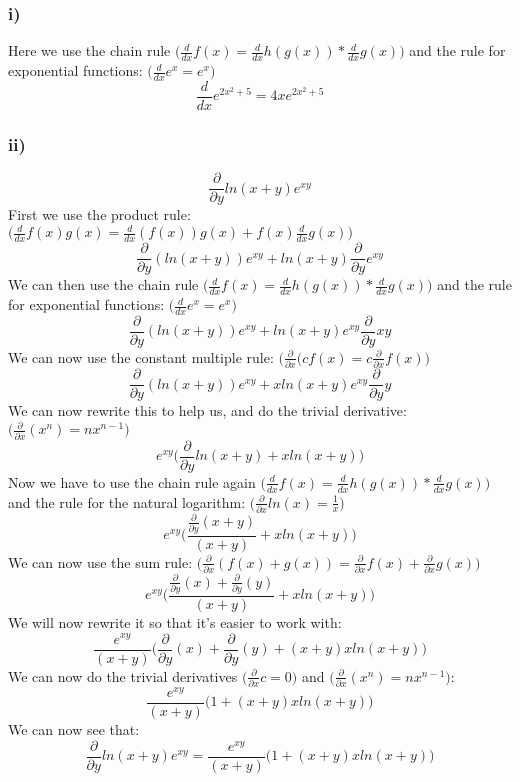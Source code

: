 \subsubsection{i)}
Here we use the chain rule $\bigg(\frac{d}{dx}f(x) = \frac{d}{dx}h(g(x))*\frac{d}{dx}g(x)\bigg)$ and the rule for exponential functions: $\bigg(\frac{d}{dx}e^x = e^x\bigg)$
$$
\frac{d}{dx}e^{2x^2+5} = 4xe^{2x^2+5}
$$
\subsubsection{ii)}
$$
\frac{\partial}{\partial y}ln(x+y)e^{xy}
$$
First we use the product rule:$\bigg(\frac{d}{dx}f(x)g(x) = \frac{d}{dx}(f(x))g(x)+f(x)\frac{d}{dx}g(x)\bigg)$
$$
\frac{\partial}{\partial y}(ln(x+y))e^{xy}+ln(x+y)\frac{\partial}{\partial y}e^{xy}
$$
We can then use the chain rule $\bigg(\frac{d}{dx}f(x) = \frac{d}{dx}h(g(x))*\frac{d}{dx}g(x)\bigg)$ and the rule for exponential functions: $\bigg(\frac{d}{dx}e^x = e^x\bigg)$
$$
\frac{\partial}{\partial y}(ln(x+y))e^{xy}+ln(x+y)e^{xy}\frac{\partial}{\partial y}xy
$$
We can now use the constant multiple rule: $\bigg(\frac{\partial}{\partial x}(cf(x) = c\frac{\partial}{\partial x}f(x)\bigg)$
$$
\frac{\partial}{\partial y}(ln(x+y))e^{xy}+xln(x+y)e^{xy}\frac{\partial}{\partial y}y
$$
We can now rewrite this to help us, and do the trivial derivative: $\bigg(\frac{\partial}{\partial x}(x^n) = nx^{n-1}\bigg)$
$$
e^{xy}\bigg(\frac{\partial}{\partial y}ln(x+y) + xln(x+y)\bigg)
$$
Now we have to use the chain rule again $\bigg(\frac{d}{dx}f(x) = \frac{d}{dx}h(g(x))*\frac{d}{dx}g(x)\bigg)$ and the rule for the natural logarithm: $\bigg(\frac{\partial}{\partial x}ln(x) = \frac{1}{x}\bigg)$
$$
e^{xy}\bigg(\frac{\frac{\partial}{\partial y}(x+y)}{(x+y)} + xln(x+y)\bigg)
$$
We can now use the sum rule: $\bigg(\frac{\partial}{\partial x}(f(x)+g(x)) = \frac{\partial}{\partial x}f(x)+\frac{\partial}{\partial x}g(x)\bigg)$
$$
e^{xy}\bigg(\frac{\frac{\partial}{\partial y}(x)+\frac{\partial}{\partial y}(y)}{(x+y)} + xln(x+y)\bigg)
$$
We will now rewrite it so that it's easier to work with:
$$
\frac{e^{xy}}{(x+y)}\bigg(\frac{\partial}{\partial y}(x)+\frac{\partial}{\partial y}(y) + (x+y)xln(x+y)\bigg)
$$
We can now do the trivial derivatives $\bigg(\frac{\partial}{\partial x}c = 0\bigg)$ and $\bigg(\frac{\partial}{\partial x}(x^n) = nx^{n-1}\bigg)$:
$$
\frac{e^{xy}}{(x+y)}\big(1 + (x+y)xln(x+y)\big)
$$
We can now see that:
$$
\frac{\partial}{\partial y}ln(x+y)e^{xy} = \frac{e^{xy}}{(x+y)}\big(1 + (x+y)xln(x+y)\big)
$$
